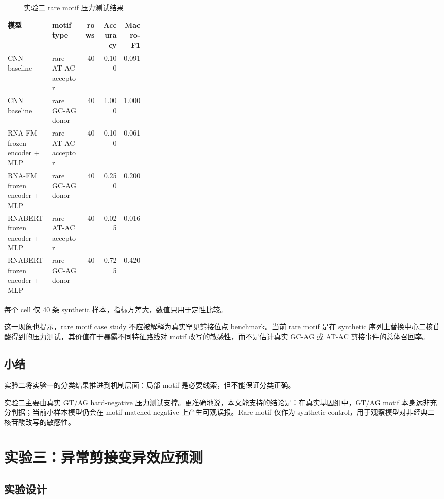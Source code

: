 \documentclass[
    oneside,
    fontset = win,
  ]{njuthesis}
\begin{document}
\begin{table}[H]
  \centering
  \caption{实验二 rare motif 压力测试结果}
  \label{tab:exp2-rare-motif}
  \begin{tabular}{>{\raggedright\arraybackslash}p{0.32\linewidth}lrrr}
    \hline
    模型 & motif type & rows & Accuracy & Macro-F1 \\
    \hline
    CNN baseline & rare AT-AC acceptor & 40 & 0.100 & 0.091 \\
    CNN baseline & rare GC-AG donor & 40 & 1.000 & 1.000 \\
    RNA-FM frozen encoder + MLP & rare AT-AC acceptor & 40 & 0.100 & 0.061 \\
    RNA-FM frozen encoder + MLP & rare GC-AG donor & 40 & 0.250 & 0.200 \\
    RNABERT frozen encoder + MLP & rare AT-AC acceptor & 40 & 0.025 & 0.016 \\
    RNABERT frozen encoder + MLP & rare GC-AG donor & 40 & 0.725 & 0.420 \\
    \hline
  \end{tabular}

  {\footnotesize 每个 cell 仅 40 条 synthetic 样本，指标方差大，数值只用于定性比较。}
\end{table}

这一现象也提示，rare motif case study 不应被解释为真实罕见剪接位点 benchmark。当前 rare motif 是在 synthetic 序列上替换中心二核苷酸得到的压力测试，其价值在于暴露不同特征路线对 motif 改写的敏感性，而不是估计真实 GC-AG 或 AT-AC 剪接事件的总体召回率。

\section{小结}

实验二将实验一的分类结果推进到机制层面：局部 motif 是必要线索，但不能保证分类正确。

实验二主要由真实 GT/AG hard-negative 压力测试支撑。更准确地说，本文能支持的结论是：在真实基因组中，GT/AG motif 本身远非充分判据；当前小样本模型仍会在 motif-matched negative 上产生可观误报。Rare motif 仅作为 synthetic control，用于观察模型对非经典二核苷酸改写的敏感性。

\chapter{实验三：异常剪接变异效应预测}

\section{实验设计}
\end{document}

